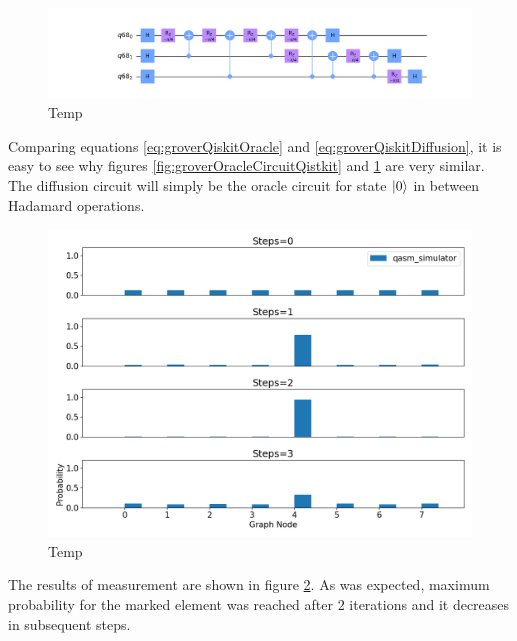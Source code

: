 \documentclass[../../dissertation.tex]{subfiles}
\begin{document}
\begin{figure}[!h]
	\centering
	\includegraphics[scale=0.30]{img/Qiskit/GroverQiskit/Circuits/GroverQiskitCircDiff_N3_M4_S3.png}
	\caption{Temp}
	\label{fig:groverDiffCircuitQistkit}
\end{figure}\par
Comparing equations \ref{eq:groverQiskitOracle} and \ref{eq:groverQiskitDiffusion}, it is easy to see why figures \ref{fig:groverOracleCircuitQistkit} and \ref{fig:groverDiffCircuitQistkit} are very similar. The diffusion circuit will simply be the oracle circuit for state $\ket{0}$ in between Hadamard operations.


\begin{figure}[!h]
	\centering
	\includegraphics[scale=0.40]{img/Qiskit/GroverQiskit/GroverQiskitSearch_N3_M4_S0123}
	\caption{Temp}
	\label{fig:groverQiskitDist}
\end{figure}
The results of measurement are shown in figure \ref{fig:groverQiskitDist}. As was expected, maximum probability for the marked element was reached after $2$ iterations and it decreases in subsequent steps.
\end{document}
